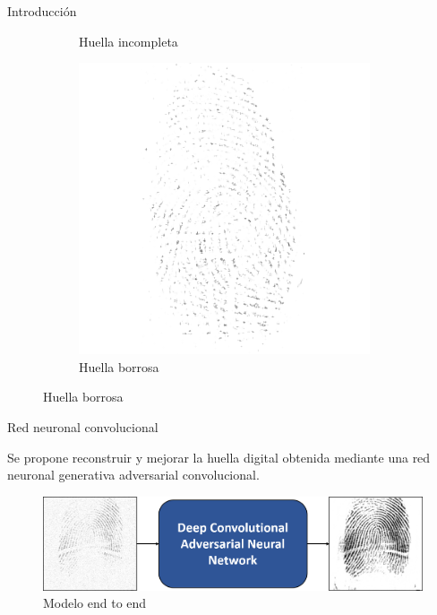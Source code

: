 \documentclass[12pt,aspectratio=169]{beamer}
\begin{document}
\begin{frame}{Introducción}
\begin{figure}
\begin{subfigure}{0.23\textwidth}
            \caption{Huella incompleta}
        \end{subfigure}
        \begin{subfigure}{0.23\textwidth}
            \centering
            \includegraphics[scale=0.3]{figs/deteriorada_0.png}
            \caption{Huella borrosa}
        \end{subfigure}
    \end{figure}

\end{frame}

\begin{frame}{Red neuronal convolucional}

    Se propone reconstruir y mejorar la huella digital obtenida mediante una red neuronal generativa adversarial convolucional.
    \vspace{5mm}

    \begin{figure}
            \includegraphics[scale=0.38]{figs/end_to_end.png}
            \caption{Modelo end to end}
    \end{figure}

\end{frame}
\end{document}
